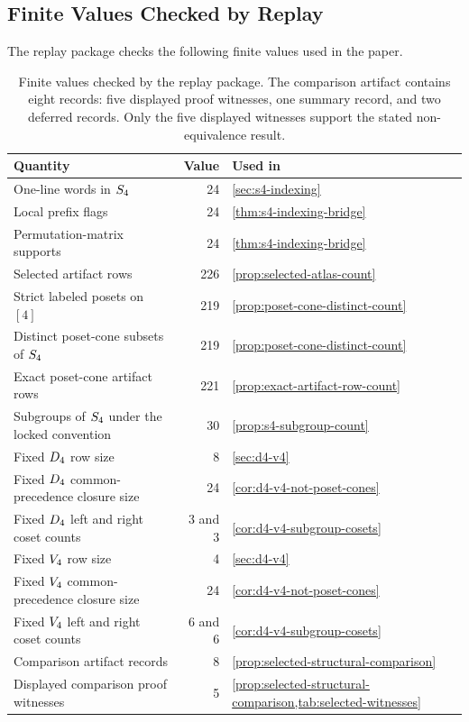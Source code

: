 \subsection{Finite Values Checked by Replay}
\label{app:finite-values-checked}

The replay package checks the following finite values used in the paper.

\begin{table}[htbp]
\centering
\small
\begin{tabular}{@{}p{}r p{}@{}}
\toprule
Quantity & Value & Used in \\
\midrule
One-line words in \(S_4\) & 24 & \cref{sec:s4-indexing} \\
Local prefix flags & 24 & \cref{thm:s4-indexing-bridge} \\
Permutation-matrix supports & 24 & \cref{thm:s4-indexing-bridge} \\
Selected artifact rows & 226 & \cref{prop:selected-atlas-count} \\
Strict labeled posets on \([4]\) & 219 & \cref{prop:poset-cone-distinct-count} \\
Distinct poset-cone subsets of \(S_4\) & 219 & \cref{prop:poset-cone-distinct-count} \\
Exact poset-cone artifact rows & 221 & \cref{prop:exact-artifact-row-count} \\
Subgroups of \(S_4\) under the locked convention & 30 & \cref{prop:s4-subgroup-count} \\
Fixed \(D_4\) row size & 8 & \cref{sec:d4-v4} \\
Fixed \(D_4\) common-precedence closure size & 24 & \cref{cor:d4-v4-not-poset-cones} \\
Fixed \(D_4\) left and right coset counts & 3 and 3 & \cref{cor:d4-v4-subgroup-cosets} \\
Fixed \(V_4\) row size & 4 & \cref{sec:d4-v4} \\
Fixed \(V_4\) common-precedence closure size & 24 & \cref{cor:d4-v4-not-poset-cones} \\
Fixed \(V_4\) left and right coset counts & 6 and 6 & \cref{cor:d4-v4-subgroup-cosets} \\
Comparison artifact records & 8 & \cref{prop:selected-structural-comparison} \\
Displayed comparison proof witnesses & 5 & \cref{prop:selected-structural-comparison,tab:selected-witnesses} \\
\bottomrule
\end{tabular}
\caption{Finite values checked by the replay package. The comparison artifact contains eight records: five displayed proof witnesses, one summary record, and two deferred records. Only the five displayed witnesses support the stated non-equivalence result.}
\label{tab:finite-values-checked}
\end{table}

